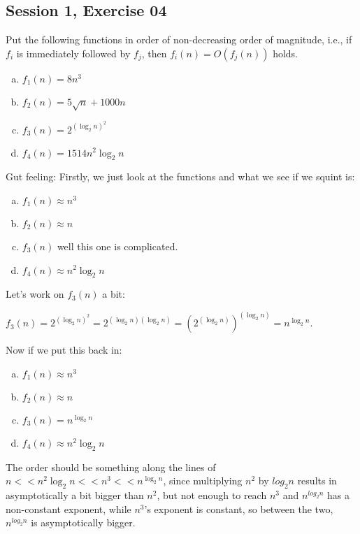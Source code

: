 \subsection{Session 1, Exercise 04}


Put the following functions in order of non-decreasing order of magnitude, i.e., if $f_i$ is immediately followed by $f_j$, then $f_i(n) = O(f_j(n))$ holds.

\begin{enumerate}[a.)]
\item $f_1(n) = 8n^3$
\item $f_2(n) = 5\sqrt{n} + 1000n$
\item $f_3(n) = 2^{(\log_{2}n)^2}$
\item $f_4(n) = 1514n^{2}\log_{2}n$
\end{enumerate}


Gut feeling: Firstly, we just look at the functions and what we see if we squint is:

\begin{enumerate}[a.)]
\item $f_1(n) \approx n^3$
\item $f_2(n) \approx n$
\item $f_3(n)$ well this one is complicated.
\item $f_4(n) \approx n^{2}\log_{2}n$
\end{enumerate}

Let's work on $f_3(n)$ a bit:

$f_3(n) = 2^{(\log_{2}n)^2} = 2^{(\log_{2}n)(\log_{2}n)} = (2^{(\log_{2}n)})^{(\log_{2}n)} = n^{\log_{2}n}$.

Now if we put this back in:

\begin{enumerate}[a.)]
\item $f_1(n) \approx n^3$
\item $f_2(n) \approx n$
\item $f_3(n) = n^{\log_{2}n}$
\item $f_4(n) \approx n^{2}\log_{2}n$
\end{enumerate}

The order should be something along the lines of $n << n^{2}\log_{2}n << n^3 << n^{\log_{2}n}$, since multiplying $n^2$ by $log_2n$ results in asymptotically a bit bigger than $n^2$, but not enough to reach $n^3$ and $n^{log_2n}$ has a non-constant exponent, while $n^3$'s exponent is constant, so between the two, $n^{log_2n}$ is asymptotically bigger.

